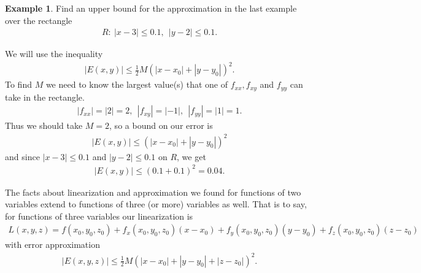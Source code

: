 \documentclass[12pt, letter]{article}
\theoremstyle{plain}
\numberwithin{theorem}{section}
\theoremstyle{definition}
\newtheorem{example}[theorem]{Example}
\begin{document}
\begin{example}
Find an upper bound for the approximation in the last example over the rectangle
\begin{align*}
R: \ |x-3| \leq 0.1, \ \ |y-2| \leq 0.1.
\end{align*}

\smallskip

We will use the inequality
\begin{align*}
|E(x,y)| \leq \frac{1}{2} M (|x-x_0|+|y-y_0|)^2.
\end{align*}
To find $M$ we need to know the largest value(s) that one of $f_{xx}, f_{xy}$ and $f_{yy}$ can take in the rectangle. 
\begin{align*}
|f_{xx}| = |2| = 2, \ \ |f_{xy}| = |-1|, \ \ |f_{yy}| = |1| = 1.
\end{align*}
Thus we should take $M=2$, so a bound on our error is
\begin{align*}
|E(x,y)| \leq (|x-x_0|+|y-y_0|)^2
\end{align*}
and since $|x-3| \leq 0.1$ and $|y-2| \leq 0.1$ on $R$, we get
\begin{align*}
|E(x,y)| \leq (0.1+0.1)^2 = 0.04.
\end{align*}
\end{example}

\bigskip

\hrulefill

\bigskip

The facts about linearization and approximation we found for functions of two variables extend to functions of three (or more) variables as well. That is to say, for functions of three variables our linearization is
\begin{align*}
L(x,y,z) = f(x_0,y_0,z_0) + f_x(x_0,y_0,z_0)(x-x_0) + f_y(x_0,y_0,z_0)(y-y_0) + f_z(x_0,y_0,z_0)(z-z_0)
\end{align*}
with error approximation
\begin{align*}
|E(x,y,z)| \leq \frac{1}{2} M \left(|x-x_0|+|y-y_0|+|z-z_0|\right)^2.
\end{align*}


\bigskip

\hrulefill

\bigskip
\end{document}
